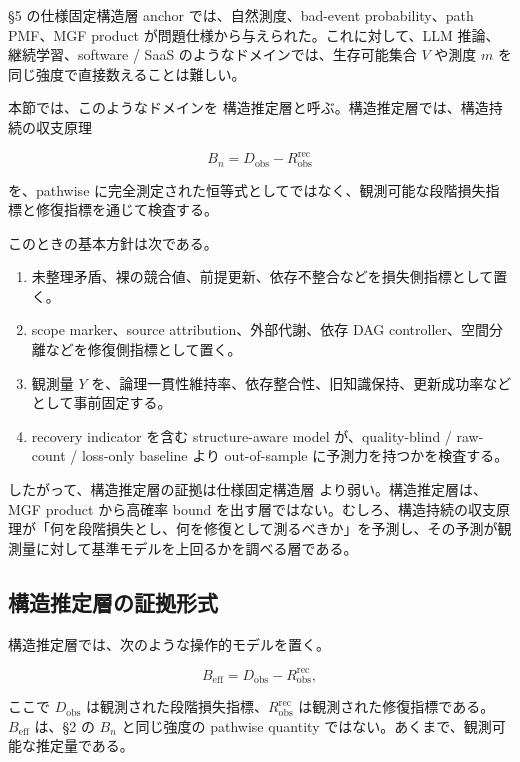 \documentclass[12pt,a4paper]{article}
\begin{document}
§5 の仕様固定構造層 anchor では、自然測度、bad-event probability、path PMF、MGF product が問題仕様から与えられた。これに対して、LLM 推論、継続学習、software / SaaS のようなドメインでは、生存可能集合 \(V\) や測度 \(m\) を同じ強度で直接数えることは難しい。

本節では、このようなドメインを 構造推定層と呼ぶ。構造推定層では、構造持続の収支原理

\[
B_{n}=D_{\mathrm{obs}}-R_{\mathrm{obs}}^{\mathrm{rec}}
\]

を、pathwise に完全測定された恒等式としてではなく、観測可能な段階損失指標と修復指標を通じて検査する。

このときの基本方針は次である。

\begin{enumerate}
\def\labelenumi{\arabic{enumi}.}
\tightlist
\item
  未整理矛盾、裸の競合値、前提更新、依存不整合などを損失側指標として置く。
\item
  scope marker、source attribution、外部代謝、依存 DAG controller、空間分離などを修復側指標として置く。
\item
  観測量 \(Y\) を、論理一貫性維持率、依存整合性、旧知識保持、更新成功率などとして事前固定する。
\item
  recovery indicator を含む structure-aware model が、quality-blind / raw-count / loss-only baseline より out-of-sample に予測力を持つかを検査する。
\end{enumerate}

したがって、構造推定層の証拠は仕様固定構造層 より弱い。構造推定層は、MGF product から高確率 bound を出す層ではない。むしろ、構造持続の収支原理が「何を段階損失とし、何を修復として測るべきか」を予測し、その予測が観測量に対して基準モデルを上回るかを調べる層である。

\subsection{構造推定層の証拠形式}\label{ux69cbux9020ux63a8ux5b9aux5c64ux306eux8a3cux62e0ux5f62ux5f0f}

構造推定層では、次のような操作的モデルを置く。

\[
B_{\mathrm{eff}} = D_{\mathrm{obs}} - R_{\mathrm{obs}}^{\mathrm{rec}},
\]

ここで \(D_{\mathrm{obs}}\) は観測された段階損失指標、\(R_{\mathrm{obs}}^{\mathrm{rec}}\) は観測された修復指標である。\(B_{\mathrm{eff}}\) は、§2 の \(B_{n}\) と同じ強度の pathwise quantity ではない。あくまで、観測可能な推定量である。
\end{document}
